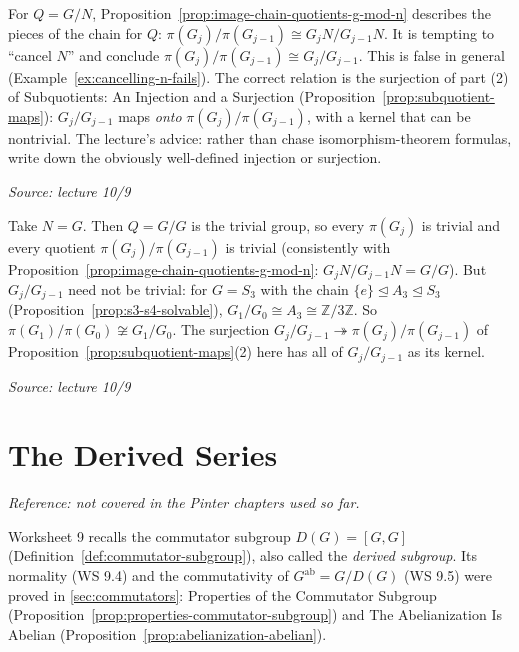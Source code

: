 \documentclass[11pt]{report}
\newcommand{\srcline}[1]{\par\hfill{\footnotesize\textit{Source: #1}}}
\begin{document}
\begin{rembox}\label{rem:do-not-cancel-n}
For $Q = G/N$, Proposition~\ref{prop:image-chain-quotients-g-mod-n} describes the pieces of the chain for $Q$: $\pi(G_j)/\pi(G_{j-1}) \cong G_jN/G_{j-1}N$. It is tempting to ``cancel $N$'' and conclude $\pi(G_j)/\pi(G_{j-1}) \cong G_j/G_{j-1}$. This is false in general (Example~\ref{ex:cancelling-n-fails}). The correct relation is the surjection of part (2) of Subquotients: An Injection and a Surjection (Proposition~\ref{prop:subquotient-maps}): $G_j/G_{j-1}$ maps \emph{onto} $\pi(G_j)/\pi(G_{j-1})$, with a kernel that can be nontrivial. The lecture's advice: rather than chase isomorphism-theorem formulas, write down the obviously well-defined injection or surjection.
\srcline{lecture 10/9}
\end{rembox}

\begin{exbox}[{Cancelling $N$ Fails for $N = G$}]\label{ex:cancelling-n-fails}
Take $N = G$. Then $Q = G/G$ is the trivial group, so every $\pi(G_j)$ is trivial and every quotient $\pi(G_j)/\pi(G_{j-1})$ is trivial (consistently with Proposition~\ref{prop:image-chain-quotients-g-mod-n}: $G_jN/G_{j-1}N = G/G$). But $G_j/G_{j-1}$ need not be trivial: for $G = S_3$ with the chain $\{e\} \trianglelefteq A_3 \trianglelefteq S_3$ (Proposition~\ref{prop:s3-s4-solvable}), $G_1/G_0 \cong A_3 \cong \mathbb{Z}/3\mathbb{Z}$. So $\pi(G_1)/\pi(G_0) \not\cong G_1/G_0$. The surjection $G_j/G_{j-1} \twoheadrightarrow \pi(G_j)/\pi(G_{j-1})$ of Proposition~\ref{prop:subquotient-maps}(2) here has all of $G_j/G_{j-1}$ as its kernel.
\srcline{lecture 10/9}
\end{exbox}

\section{The Derived Series}\label{sec:derived-series}

\textit{Reference: not covered in the Pinter chapters used so far.}

\begin{rembox}\label{rem:derived-subgroup}
Worksheet 9 recalls the commutator subgroup $D(G) = [G, G]$ (Definition~\ref{def:commutator-subgroup}), also called the \emph{derived subgroup}. Its normality (WS 9.4) and the commutativity of $G^{\mathrm{ab}} = G/D(G)$ (WS 9.5) were proved in \ref{sec:commutators}: Properties of the Commutator Subgroup (Proposition~\ref{prop:properties-commutator-subgroup}) and The Abelianization Is Abelian (Proposition~\ref{prop:abelianization-abelian}).
\end{rembox}
\end{document}

